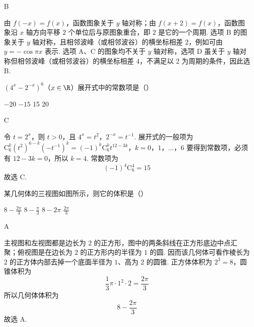 \begin{answer}
B
\end{answer}

\begin{solution}
由 \(f(-x)=f(x)\)，函数图象关于 \(y\) 轴对称；由 \(f(x+2)=f(x)\)，函数图象沿 \(x\) 轴方向平移 \(2\) 个单位后与原图象重合，即 \(2\) 是它的一个周期. 选项 B 的图象关于 \(y\) 轴对称，且相邻波峰（或相邻波谷）的横坐标相差 \(2\)，例如可由 \(y=-\cos \pi x\) 表示. 选项 A、C 的图象均不关于 \(y\) 轴对称，选项 D 虽关于 \(y\) 轴对称但相邻波峰（或相邻波谷）的横坐标相差 \(4\)，不满足以 \(2\) 为周期的条件，因此选 B.
\end{solution}

\begin{problem}
\((4^{x} - 2^{-x})^{6}\)（\(x \in \R\)）展开式中的常数项是（\quad）

\choices
    {\(-20\)}
    {\(-15\)}
    {15}
    {20}
\end{problem}

\begin{answer}
C
\end{answer}

\begin{solution}
令 \(t=2^x\)，则 \(t>0\)，且 \(4^x=t^2\)，\(2^{-x}=t^{-1}\). 展开式的一般项为
\(\mathrm C_6^k(t^2)^{6-k}(-t^{-1})^k=(-1)^k\mathrm C_6^k t^{12-3k}\)，\(k=0\)，\(1\)，\(\ldots\)，\(6\)
要得到常数项，必须有 \(12-3k=0\)，所以 \(k=4\). 常数项为
\[
(-1)^4\mathrm C_6^4=15
\]
故选 C.
\end{solution}

\begin{problem}
某几何体的三视图如图所示，则它的体积是（\quad）



\choices
    {\(8 - \frac{2\pi}{3}\)}
    {\(8 - \frac{\pi}{3}\)}
    {\(8 - 2\pi\)}
    {\(\frac{2\pi}{3}\)}
\end{problem}

\begin{answer}
A
\end{answer}

\begin{solution}
主视图和左视图都是边长为 \(2\) 的正方形，图中的两条斜线在正方形底边中点汇聚；俯视图是在边长为 \(2\) 的正方形内的半径为 \(1\) 的圆. 因而该几何体可看作棱长为 \(2\) 的正方体内部去掉一个底面半径为 \(1\)、高为 \(2\) 的圆锥. 正方体体积为 \(2^3=8\)，圆锥体积为
\[
\frac{1}{3}\pi\cdot 1^2\cdot 2=\frac{2\pi}{3}
\]
所以几何体体积为
\[
8-\frac{2\pi}{3}
\]
故选 A.
\end{solution}

